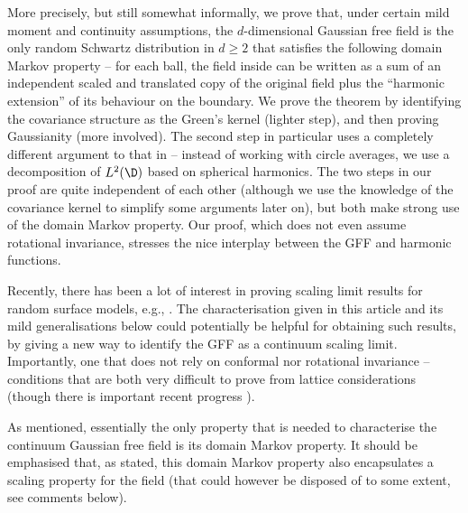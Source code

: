 \documentclass[10pt]{amsart}
\theoremstyle{definition}
\begin{document}
More precisely, but still somewhat informally, we prove that, under certain mild moment and continuity assumptions, the $d$-dimensional Gaussian free field is the only random Schwartz distribution in $d \geq 2$ that satisfies the following domain Markov property -- for each ball, the field inside can be written as a sum of an independent scaled and translated copy of the original field plus the ``harmonic extension'' of its behaviour on the boundary. We prove the theorem by identifying the covariance structure as the Green's kernel (lighter step), and then proving Gaussianity (more involved). The second step in particular uses a completely different argument to that in \cite{BPR18} -- {instead of working with circle averages, we use a decomposition of $L^2(\D)$ based on spherical harmonics}. The two steps in our proof are quite independent of each other (although we use the knowledge of the covariance kernel to simplify some arguments later on), but both make strong use of the domain Markov property. Our proof, which does not even assume rotational invariance, stresses the nice interplay between the GFF and harmonic functions.

Recently, there has been a lot of interest in proving scaling limit results for random surface models, e.g., \cite{SquareIce,BLRsurface, GM21}. The characterisation given in this article {and its mild generalisations below} could potentially be helpful for obtaining such results, by giving a new way to identify the GFF as a continuum scaling limit. Importantly, one that does not rely on conformal nor rotational invariance -- conditions that are both very difficult to prove from lattice considerations (though there is important recent progress \cite{mano}).

As mentioned, essentially the only property that is needed to characterise the continuum Gaussian free field is its domain Markov property. It should be emphasised that, as stated, this domain Markov property also encapsulates a scaling property for the field (that could however be disposed of to some extent, see comments below).\enlargethispage{.5\baselineskip}%
\end{document}
